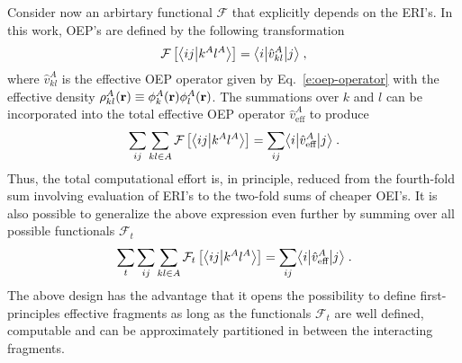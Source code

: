 \documentclass[aip,jcp,amsmath,amssymb,reprint,floatfix]{revtex4-1}
\begin{document}
Consider now an arbirtary functional $\mathcal{F}$ that explicitly depends on the 
ERI's. In this work, OEP's are defined by the following transformation
%
 \begin{equation}
 \mathcal{F}
 \left[ 
   \bigl\langle {ij} \bigl\lvert {k^Al^A} \bigr\rangle
	 \right] = \bigl\langle {i} \bigl\lvert {\hat{v}_{kl}^A} \bigl\lvert {j} \bigr\rangle  \;,
 \end{equation}
%
where 
$\hat{v}_{kl}^A$ is the effective OEP operator given by Eq.~\eqref{e:oep-operator} 
with the
effective density $\rho_{kl}^A({\bf r}) \equiv \phi_k^A({\bf r})\phi_l^A({\bf r})$.
The summations over $k$ and $l$ can be incorporated into the total effective OEP operator
$\hat{v}_{\text{eff}}^A$
to produce
%
\begin{equation}
	\sum_{ij}\sum_{kl\in A} \mathcal{F}\left[ 
   \bigl\langle {ij} \bigl\lvert {k^Al^A} \bigr\rangle
 \right] = \sum_{ij} \bigl\langle {i} \bigl\lvert {\hat{v}_{\text{eff}}^A} \bigl\lvert {j} \bigr\rangle  \;.
\end{equation}
%
Thus, the total computational effort is, in principle, reduced from the fourth\hyp{}fold
sum involving evaluation of ERI's to the two\hyp{}fold sums of cheaper OEI's.
It is also possible to generalize the above expression even further by
summing over all possible functionals ${\mathcal{F}}_t$
%
\begin{equation} \label{e:ft-reduction}
	\sum_t \sum_{ij}\sum_{kl\in A} {\mathcal{F}}_t\left[ 
   \bigl\langle {ij} \bigl\lvert {k^Al^A} \bigr\rangle
 \right] = \sum_{ij} \bigl\langle {i} \bigl\lvert {\hat{v}_{\text{eff}}^A} \bigl\lvert {j} \bigr\rangle \;.
\end{equation}
%
The above design has the advantage that it opens the possibility to define first\hyp{}principles
effective fragments as long as 
the functionals ${\mathcal{F}}_t$ 
are well defined, computable and can be approximately
partitioned in between the interacting fragments.
\end{document}
